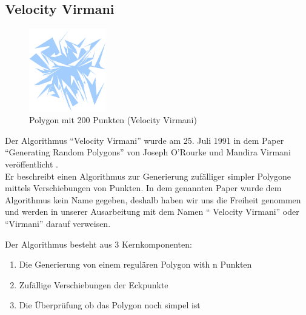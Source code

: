 \subsection{Velocity Virmani}

	\begin{figure}[h]
		\begin{center}
			\includegraphics[width=0.3\textwidth]{img/virmani200.eps}
		\end{center}
		\caption{Polygon mit 200 Punkten (Velocity Virmani)}
		\label{fig:virmani200}
	\end{figure}

	Der Algorithmus \enquote{Velocity Virmani} wurde am 25. Juli 1991 in dem 
	Paper \enquote{Generating Random Polygons} von Joseph O'Rourke und Mandira 
	Virmani veröffentlicht \cite{virmani91polygons}.\smallskip \\ 
	Er beschreibt einen Algorithmus zur Generierung zufälliger simpler 
	Polygone mittels Verschiebungen von Punkten. In dem genannten Paper wurde 
	dem Algorithmus kein Name gegeben, deshalb haben wir uns die Freiheit 
	genommen und werden in unserer Ausarbeitung mit dem Namen \enquote{
	Velocity Virmani} oder \enquote{Virmani} darauf verweisen.

	Der Algorithmus besteht aus 3 Kernkomponenten:
	\begin{enumerate}
		\item Die Generierung von einem regulären Polygon with n Punkten
		\item Zufällige Verschiebungen der Eckpunkte
		\item Die Überprüfung ob das Polygon noch simpel ist
	\end{enumerate}

